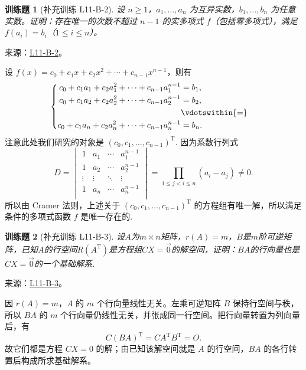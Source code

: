 \documentclass[12pt,fontset=fandol]{ctexart}
\newtheorem{exercise}{训练题}[section]
\begin{document}
\begin{exercise}[补充训练 L11-B-2]\label{prob:L11-B-2}
设 $n\ge1$，$a_1,\ldots,a_n$ 为互异实数，$b_1,\ldots,b_n$ 为任意实数。证明：存在唯一的次数不超过 $n-1$ 的实多项式 $f$（包括零多项式），满足 $f(a_i)=b_i$（$1\le i\le n$）。
\end{exercise}
\noindent 来源：\href{https://github.com/yhwu-is/Linear-Algebra-Left-Undone/blob/new/%E8%AE%B2%E4%B9%89/%E4%B8%93%E9%A2%98/11%20%E6%9C%9D%E8%8A%B1%E5%A4%95%E6%8B%BE.tex}{L11-B-2}。
\begin{solve}
设 $f(x) = c_0+c_1x+c_2x^2+\cdots+c_{n-1}x^{n-1}$，则有
            \[\begin{cases} \begin{aligned}
                        c_0+c_1a_1+c_2a_1^2+\cdots+c_{n-1}a_1^{n-1} & = b_1,            \\
                        c_0+c_1a_2+c_2a_2^2+\cdots+c_{n-1}a_2^{n-1} & = b_2,            \\
                                                                    & \vdotswithin{ = } \\
                        c_0+c_1a_n+c_2a_n^2+\cdots+c_{n-1}a_n^{n-1} & = b_n.            \\
                    \end{aligned} \end{cases}\]
            注意此处我们研究的对象是 $(c_0, c_1, \ldots, c_{n-1})^{\mathrm{T}}$. 因为系数行列式
            \[D = \begin{vmatrix}
                    1      & a_1    & \cdots & a_1^{n-1} \\
                    1      & a_2    & \cdots & a_2^{n-1} \\
                    \vdots & \vdots & \ddots & \vdots    \\
                    1      & a_n    & \cdots & a_n^{n-1} \\
                \end{vmatrix} = \prod_{1 \leqslant j < i \leqslant n} (a_i-a_j) \neq 0.\]
            所以由 Cramer 法则，上述关于 $(c_0, c_1, \ldots, c_{n-1})^{\mathrm{T}}$ 的方程组有唯一解，所以满足条件的多项式函数 $f$ 是唯一存在的.
\end{solve}

\begin{exercise}[补充训练 L11-B-3]\label{prob:L11-B-3}
设$A$为$m \times n$矩阵，$r(A)=m$，$B$是$m$阶可逆矩阵，已知$A$的行空间$R(A^\mathrm{T})$是方程组$CX=\vec{0}$的解空间，证明：$BA$的行向量也是$CX=\vec{0}$的一个基础解系.
\end{exercise}
\noindent 来源：\href{https://github.com/yhwu-is/Linear-Algebra-Left-Undone/blob/new/%E8%AE%B2%E4%B9%89/%E4%B8%93%E9%A2%98/11%20%E6%9C%9D%E8%8A%B1%E5%A4%95%E6%8B%BE.tex}{L11-B-3}。
\begin{solve}
因 $r(A)=m$，$A$ 的 $m$ 个行向量线性无关。左乘可逆矩阵 $B$ 保持行空间与秩，所以 $BA$ 的 $m$ 个行向量仍线性无关，并张成同一行空间。把行向量转置为列向量后，有
\[C(BA)^{\mathrm T}=CA^{\mathrm T}B^{\mathrm T}=O.\]
故它们都是方程 $CX=0$ 的解；由已知该解空间就是 $A$ 的行空间，$BA$ 的各行转置后构成所求基础解系。
\end{solve}
\end{document}
